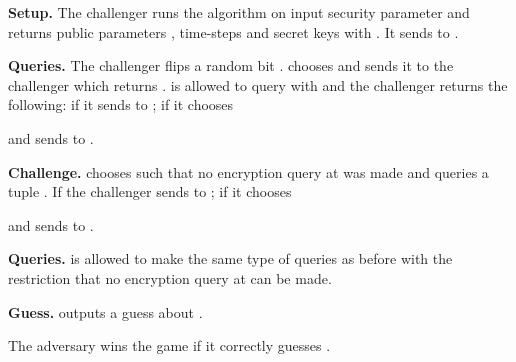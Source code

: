 \documentclass[10pt]{extarticle}
\begin{document}
\noindent\begin{description}
 \item\textbf{Setup.} The challenger runs the  algorithm on input security parameter  and returns public parameters , time-steps  and secret keys  with . It sends  to .
\item\textbf{Queries.} The challenger flips a random bit .  chooses  and sends it to the challenger which returns .  is allowed to query  with  and the challenger returns the following: if  it sends  to ; if  it chooses 

and sends  to .
\item\textbf{Challenge.}  chooses  such that no encryption query at  was made and queries a tuple . If  the challenger sends  to ; if  it chooses 

and sends  to .
\item\textbf{Queries.}  is allowed to make the same type of queries as before with the restriction that no encryption query at  can be made.
\item\textbf{Guess.}  outputs a guess about .
\end{description}
The adversary wins the game if it correctly guesses .\\
\end{document}
